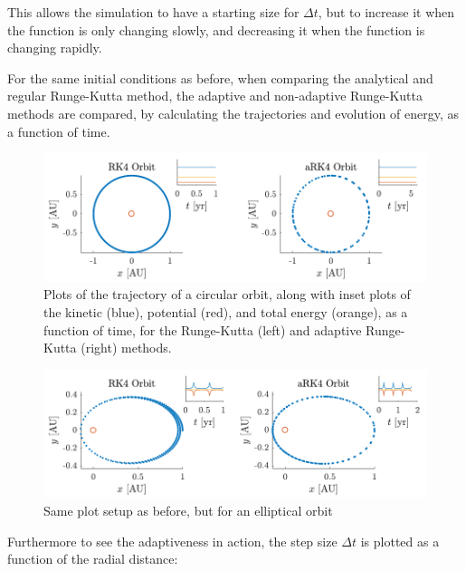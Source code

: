 \documentclass[a4paper,10pt]{article} 	%
\numberwithin{equation}{section}
\begin{document}
	This allows the simulation to have a starting size for $ \Delta t $, but to increase it when the function is only changing slowly, and decreasing it when the function is changing rapidly. 
	
	For the same initial conditions as before, when comparing the analytical and regular Runge-Kutta method, the adaptive and non-adaptive Runge-Kutta methods are compared, by calculating the trajectories and evolution of energy, as a function of time.
	\begin{figure}[H]
		\centering
		\includegraphics[width = \linewidth]{RK42pi.pdf}
		\caption{Plots of the trajectory of a circular orbit, along with inset plots of the kinetic (blue), potential (red), and total energy (orange), as a function of time, for the Runge-Kutta (left) and adaptive Runge-Kutta (right) methods.}
		\label{fig:KeplerAdaptive1}
	\end{figure}
	\begin{figure}[H]
		\centering
		\includegraphics[width = \linewidth]{RK41pi.pdf}
		\caption{Same plot setup as before, but for an elliptical orbit}
		\label{fig:KeplerAdaptive2}
	\end{figure}
	
	Furthermore to see the adaptiveness in action, the step size $ \Delta t$ is plotted as a function of the radial distance:
	
\end{document}
